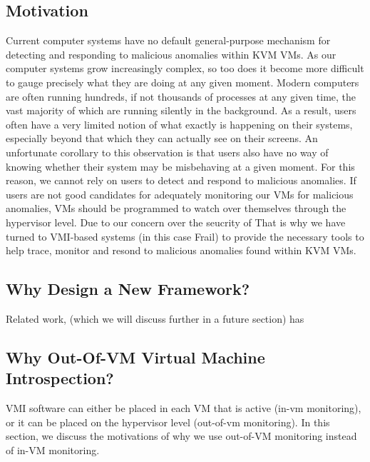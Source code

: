 \documentclass{report}
\begin{document}
\begin{spacing}{1.5}
\section{Motivation}
{\large
Current computer systems have no default general-purpose mechanism for detecting and responding to malicious anomalies within KVM VMs. As our computer systems grow increasingly complex, so too does it become more difficult to gauge precisely what they are doing at any given moment. Modern computers are often running hundreds, if not thousands of processes at any given time, the vast majority of which are running silently in the background. As a result, users often have a very limited notion of what exactly is happening on their systems, especially beyond that which they can actually see on their screens. An unfortunate corollary to this observation is that users also have no way of knowing whether their system may be misbehaving at a given moment. For this reason, we cannot rely on users to detect and respond to malicious anomalies. If users are not good candidates for adequately monitoring our VMs for malicious anomalies, VMs should be programmed to watch over themselves through the hypervisor level. Due to our concern over the seucrity of  That is why we have turned to VMI-based systems (in this case Frail) to provide the necessary tools to help trace, monitor and resond to malicious anomalies found within KVM VMs.
\newline
}






\subsection{Why Design a New Framework?}

Related work, (which we will discuss further in a future section) has 


\subsection{Why Out-Of-VM Virtual Machine Introspection?}

{\large
VMI software can either be placed in each VM that is active (in-vm monitoring), or it can be placed on the hypervisor level (out-of-vm monitoring). In this section, we discuss the motivations of why we use out-of-VM monitoring instead of in-VM monitoring.
\newline
}



\end{spacing}
\end{document}
